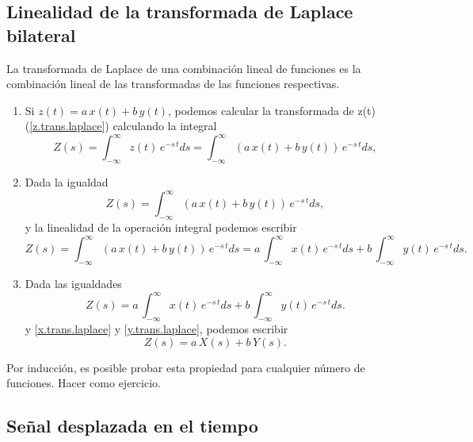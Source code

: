 \subsection{Linealidad de la transformada de Laplace bilateral}

La transformada de Laplace de una combinaci\'{o}n lineal de funciones es la combinaci\'{o}n lineal de las transformadas de las funciones respectivas.

\begin{enumerate}
\item Si $z(t) = a \, x(t) + b \, y(t)$, podemos calcular la transformada de z(t) (\ref{z.trans.laplace}) calculando la integral
\begin{equation}
  Z(s) = \int_{-\infty}^{\infty}  z(t) \, e^{-s \, t} ds = \int_{-\infty}^{\infty} (a \, x(t) + b \, y(t) )  \, e^{-s \, t} ds,
\end{equation}

\item Dada la igualdad
\begin{equation}
  Z(s) = \int_{-\infty}^{\infty} (a \, x(t) + b \, y(t) )  \, e^{-s \, t} ds,
\end{equation}
y la linealidad de la operaci\'{o}n integral podemos escribir
\begin{equation}
  Z(s) = \int_{-\infty}^{\infty} (a \, x(t) + b \, y(t) )  \, e^{-s \, t} ds = 
    a \,  \int_{-\infty}^{\infty} x(t) \, e^{-s \, t} ds + b \,  \int_{-\infty}^{\infty} y(t) \, e^{-s \, t} ds.
\end{equation}

\item Dada las igualdades
\begin{equation}
  Z(s) = a \,  \int_{-\infty}^{\infty} x(t) \, e^{-s \, t} ds + b \,  \int_{-\infty}^{\infty} y(t) \, e^{-s \, t} ds.
\end{equation}
y \ref{x.trans.laplace} y \ref{y.trans.laplace}, podemos escribir
\begin{equation}
  Z(s) = a \,  X(s) + b \, Y(s).
\end{equation}

\end{enumerate}

Por inducci\'{o}n, es posible probar esta propiedad para cualquier n\'{u}mero de funciones. Hacer como ejercicio.

\subsection{Se\~{n}al desplazada en el tiempo}

